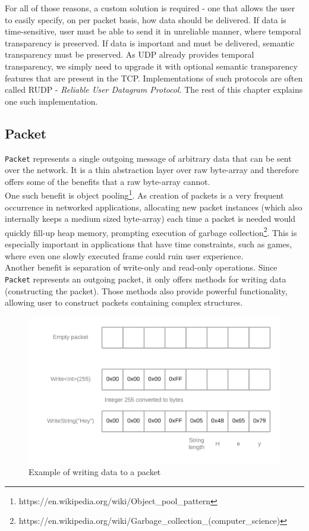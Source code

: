 \documentclass[times, utf8, diplomski]{fer}
\newcommand{\classname}[1]{\texttt{#1}}
\begin{document}
For all of those reasons, a custom solution is required - one that allows the user to easily specify, on per packet basis, how data should be delivered. If data is time-sensitive, user must be able to send it in unreliable manner, where temporal transparency is preserved. If data is important and must be delivered, semantic transparency must be preserved. As UDP already provides temporal transparency, we simply need to upgrade it with optional semantic transparency features that are present in the TCP. Implementations of such protocols are often called RUDP - \textit{Reliable User Datagram Protocol}. The rest of this chapter explains one such implementation.



\subsection{Packet}
\classname{Packet} represents a single outgoing message of arbitrary data that can be sent over the network. It is a thin abstraction layer over raw byte-array and therefore offers some of the benefits that a raw byte-array cannot. \\

One such benefit is object pooling\footnote{https://en.wikipedia.org/wiki/Object\_pool\_pattern}. As creation of packets is a very frequent occurrence in networked applications, allocating new packet instances (which also internally keeps a medium sized byte-array) each time a packet is needed would quickly fill-up heap memory, prompting execution of garbage collection\footnote{https://en.wikipedia.org/wiki/Garbage\_collection\_(computer\_science)}. This is especially important in applications that have time constraints, such as games, where even one slowly executed frame could ruin user experience. \\

Another benefit is separation of write-only and read-only operations. Since \classname{Packet} represents an outgoing packet, it only offers methods for writing data (constructing the packet). Those methods also provide powerful functionality, allowing user to construct packets containing complex structures. \\

\begin{figure}[h!]
	\centering
	\includegraphics[scale=0.22]{Packet-write}
	\caption{Example of writing data to a packet}
\end{figure}
\end{document}
